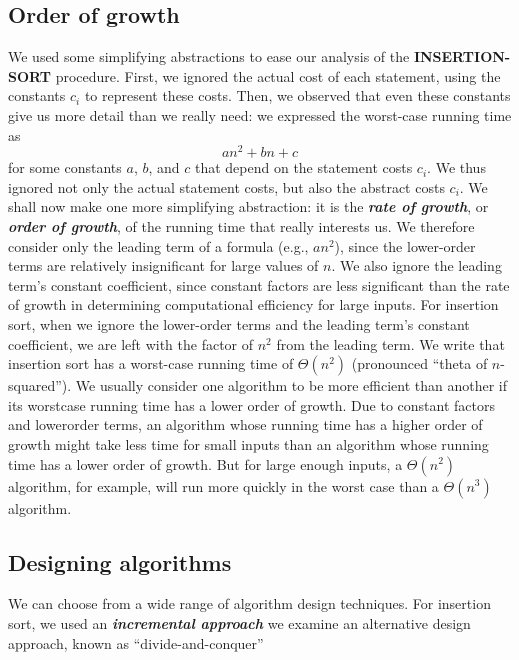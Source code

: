 \documentclass{report}
\begin{document}
    \subsection{Order of growth}
    \bigbreak \noindent 
    We used some simplifying abstractions to ease our analysis of the \textbf{INSERTION-SORT} procedure. First, we ignored the actual cost of each statement, using the constants \( c_i \) to represent these costs. Then, we observed that even these constants give us more detail than we really need: we expressed the worst-case running time as 
    \[
        an^2 + bn + c
    \]
    for some constants \( a \), \( b \), and \( c \) that depend on the statement costs \( c_i \). We thus ignored not only the actual statement costs, but also the abstract costs \( c_i \).
    \bigbreak \noindent 
    We shall now make one more simplifying abstraction: it is the \textbf{\textit{rate of growth}}, or \textbf{\textit{order of growth}}, of the running time that really interests us. We therefore consider only the leading term of a formula (e.g., \( an^2 \)), since the lower-order terms are relatively insignificant for large values of \( n \). We also ignore the leading term's constant coefficient, since constant factors are less significant than the rate of growth in determining computational efficiency for large inputs. 
    \bigbreak \noindent 
    For insertion sort, when we ignore the lower-order terms and the leading term’s constant coefficient, we are left with the factor of \( n^2 \) from the leading term. We write that insertion sort has a worst-case running time of \( \Theta(n^2) \) (pronounced ``theta of \( n \)-squared''). 
    \bigbreak \noindent 
    We usually consider one algorithm to be more efficient than another if its worstcase running time has a lower order of growth. Due to constant factors and lowerorder terms, an algorithm whose running time has a higher order of growth might take less time for small inputs than an algorithm whose running time has a lower order of growth. But for large enough inputs, a $\Theta(n^{2}) $ algorithm, for example, will run more quickly in the worst case than a $\Theta(n^{3})$ algorithm.


    \pagebreak 
    \subsection{Designing algorithms}
    \bigbreak \noindent 
    We can choose from a wide range of algorithm design techniques. For insertion sort, we used an \textbf{\textit{incremental approach}}
    \bigbreak \noindent 
    we examine an alternative design approach, known as “divide-and-conquer”
    \bigbreak \noindent 
\end{document}
